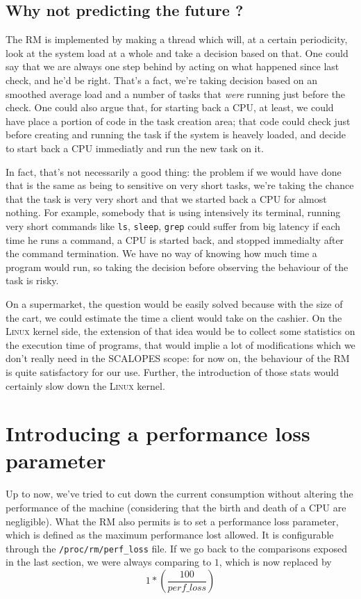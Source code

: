 \documentclass{report}
\renewcommand{\tt}[1]{\texttt{{{#1}}}}
\begin{document}
\subsection{Why not predicting the future ?}

The RM is implemented by making a thread which will, at a certain periodicity,
look at the system load at a whole and take a decision based on that. One could
say that we are always one step behind by acting on what happened since last
check, and he'd be right. That's a fact, we're taking decision based on an
smoothed average load and a number of tasks that {\em were} running just before
the check. One could also argue that, for starting back a CPU, at least, we
could have place a portion of code in the task creation area; that code could
check just before creating and running the task if the system is heavely
loaded, and decide to start back a CPU immediatly and run the new task on it.

In fact, that's not necessarily a good thing: the problem if we would have done
that is the same as being to sensitive on very short tasks, we're taking the
chance that the task is very very short and that we started back a CPU for
almost nothing. For example, somebody that is using intensively its terminal,
running very short commands like \tt{ls}, \tt{sleep}, \tt{grep} could suffer
from big latency if each time he runs a command, a CPU is started back, and
stopped immedialty after the command termination. We have no way of knowing how
much time a program would run, so taking the decision before observing the
behaviour of the task is risky.

On a supermarket, the question would be easily solved because with the size of
the cart, we could estimate the time a client would take on the cashier. On the
\textsc{Linux} kernel side, the extension of that idea would be to collect some
statistics on the execution time of programs, that would implie a lot of
modifications which we don't really need in the SCALOPES scope: for now on, the
behaviour of the RM is quite satisfactory for our use. Further, the
introduction of those stats would certainly slow down the \textsc{Linux}
kernel.

\section{Introducing a performance loss parameter}

Up to now, we've tried to cut down the current consumption without altering the
performance of the machine (considering that the birth and death of a CPU are
negligible). What the RM also permits is to set a performance loss parameter,
which is defined as the maximum performance lost allowed. It is configurable
through the \tt{/proc/rm/perf\_loss} file. If we go back to the comparisons
exposed in the last section, we were always comparing to $1$, which is now
replaced by
\[1 * \left(\frac{100}{perf\_loss}\right)\]
\end{document}
